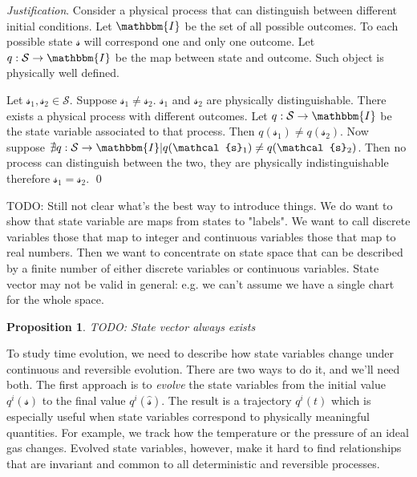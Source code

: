 \documentclass[aps,pra,10pt,twocolumn,floatfix,nofootinbib]{revtex4-1}
\newtheorem{prop}{Proposition}[section]
\theoremstyle{definition}
\newenvironment{justification}{\emph{Justification}.}{\qed}
\begin{document}
\begin{justification}
Consider a physical process that can distinguish between different initial conditions. Let $\mathbbm{I}$ be the set of all possible outcomes. To each possible state $\mathcal{s}$ will correspond one and only one outcome. Let $q : \mathcal{S} \rightarrow \mathbbm{I}$ be the map between state and outcome. Such object is physically well defined.

Let $\mathcal{s}_1, \mathcal{s}_2 \in \mathcal{S}$. Suppose $\mathcal{s}_1 \neq \mathcal{s}_2$. $\mathcal{s}_1$ and $\mathcal{s}_2$ are physically distinguishable. There exists a physical process with different outcomes. Let $q : \mathcal{S} \rightarrow \mathbbm{I}$ be the state variable associated to that process. Then $q(\mathcal{s}_1)\neq q(\mathcal{s}_2)$. Now suppose $\nexists q : \mathcal{S} \rightarrow \mathbbm{I} | q(\mathcal{s}_1) \neq q(\mathcal{s}_2)$. Then no process can distinguish between the two, they are physically indistinguishable therefore $\mathcal{s}_1 = \mathcal{s}_2$.
\end{justification}

TODO: Still not clear what's the best way to introduce things. We do want to show that state variable are maps from states to "labels". We want to call discrete variables those that map to integer and continuous variables those that map to real numbers. Then we want to concentrate on state space that can be described by a finite number of either discrete variables or continuous variables. State vector may not be valid in general: e.g. we can't assume we have a single chart for the whole space. 

\begin{prop}\label{state_vector}
TODO: State vector always exists
\end{prop}

To study time evolution, we need to describe how state variables change under continuous and reversible evolution. There are two ways to do it, and we'll need both. The first approach is to \emph{evolve} the state variables from the initial value $q^i(\mathcal{s})$ to the final value $q^i(\hat{\mathcal{s}})$. The result is a trajectory $q^i(t)$ which is especially useful when state variables correspond to physically meaningful quantities. For example, we track how the temperature or the pressure of an ideal gas changes. Evolved state variables, however, make it hard to find relationships that are invariant and common to all deterministic and reversible processes.
\end{document}
